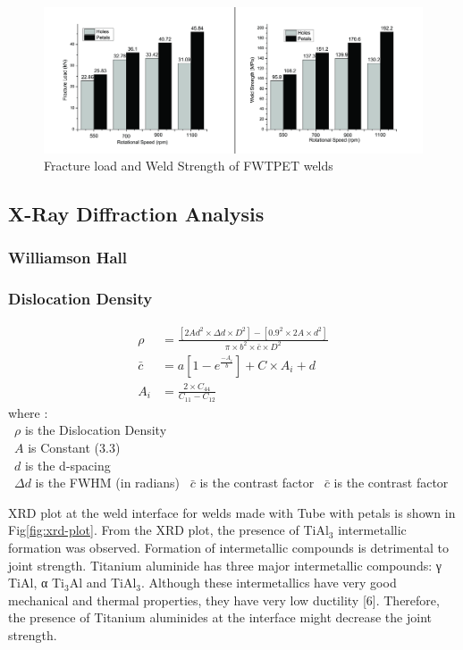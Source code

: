 \documentclass[3p]{elsarticle}
\begin{document}
\begin{figure}[H]
\centering
\includegraphics[width=\textwidth,keepaspectratio]{images/Strength.jpg}
\caption{Fracture load and Weld Strength of FWTPET welds}
\label{fig:weld-strength}
\end{figure}

\subsection{X-Ray Diffraction Analysis}
\label{subsec:XRD-Results}

\subsubsection{Williamson Hall}
\label{subsec:Williamson-Hall}




\subsubsection{Dislocation Density}
\label{subsec:Dislocation-Denstiy}
\begin{align} 
\rho  &= \frac{[2Ad^{2} \times \Delta d \times D^{2}]-[0.9^{2} \times 2A \times d^{2}]}{\pi \times b^{2} \times \bar{c} \times D^{2}} \label{eq:Dislocation-Denstiy} \\
\bar{c} &= a[1-e^{\frac{-A_{i}}{b}}] + C \times A_{i} + d \label{eq:C-bar} \\
A_{i} &= \frac{2 \times C_{44}}{C_{11} - C_{12}} \label{eq:ai}
\end{align}
where :\\
~$\rho$ is the Dislocation Density \\
~$A$ is Constant (3.3) \\
~$d$ is the d-spacing \\
~$\Delta d$ is the FWHM (in radians)
~$\bar{c}$ is the contrast factor
~$\bar{c}$ is the contrast factor


XRD plot at the weld interface for welds made with Tube with petals is shown in Fig\ref{fig:xrd-plot}. From the XRD plot, the presence of TiAl$_{3}$ intermetallic formation was observed. Formation of intermetallic compounds is detrimental to joint strength. Titanium aluminide has three major intermetallic compounds: γ TiAl, α Ti$_{3}$Al and TiAl$_{3}$. Although these intermetallics have very good mechanical and thermal properties, they have very low ductility [6]. Therefore, the presence of Titanium aluminides at the interface might decrease the joint strength.
\end{document}
